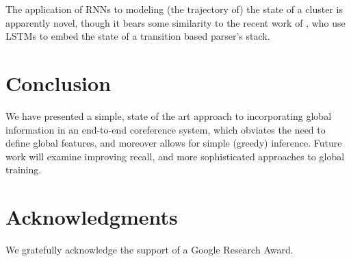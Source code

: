 \documentclass[11pt,letterpaper]{article}
\begin{document}
The application of RNNs to modeling (the trajectory of) the state of a cluster is apparently novel, though it bears some similarity to the recent work of , who use LSTMs to embed the state of a transition based parser's stack.
 
\section{Conclusion}
We have presented a simple, state of the art approach to incorporating global information in an end-to-end coreference system, which obviates the need to define global features, and moreover allows for simple (greedy) inference. Future work will examine improving recall, and more sophisticated approaches to global training.

\section*{Acknowledgments}
We gratefully acknowledge the support of a Google Research Award.

\nocite{koehn2004statistical}
\nocite{cort}


\end{document}

